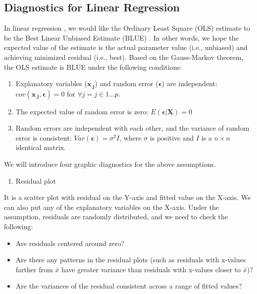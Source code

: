 \documentclass[12pt,]{krantz}
\providecommand{\tightlist}{%
  \setlength{\itemsep}{0pt}\setlength{\parskip}{0pt}}
\begin{document}
\hypertarget{diagnostics-for-linear-regression}{%
\subsection{Diagnostics for Linear Regression}\label{diagnostics-for-linear-regression}}

In linear regression , we would like the Ordinary Least Square (OLS)  estimate to be the Best Linear Unbiased Estimate (BLUE) . In other words, we hope the expected value of the estimate is the actual parameter value (i.e., unbiased) and achieving minimized residual (i.e., best). Based on the Gauss-Markov theorem, the OLS  estimate is BLUE  under the following conditions:

\begin{enumerate}
\def\labelenumi{\arabic{enumi}.}
\item
  Explanatory variables (\(\mathbf{x_{.j}}\)) and random error (\(\mathbf{\epsilon}\)) are independent: \(cov(\mathbf{x_{.j},\epsilon})=0\) for \(\forall j=j\in1...p\).
\item
  The expected value of random error is zero: \(E(\mathbf{\epsilon|X})=0\)
\item
  Random errors are independent with each other, and the variance of random error is consistent: \(Var(\mathbf{\epsilon})=\sigma^{2}I\), where \(\sigma\) is positive and \(I\) is a \(n \times n\) identical matrix.
\end{enumerate}

We will introduce four graphic diagnostics for the above assumptions.

\begin{enumerate}
\def\labelenumi{(\arabic{enumi})}
\tightlist
\item
  Residual plot 
\end{enumerate}

It is a scatter plot with residual on the Y-axis and fitted value on the X-axis. We can also put any of the explanatory variables on the X-axis. Under the assumption, residuals are randomly distributed, and we need to check the following:

\begin{itemize}
\tightlist
\item
  Are residuals centered around zero?
\item
  Are there any patterns in the residual plots (such as residuals with x-values farther from \(\bar{x}\) have greater variance than residuals with x-values closer to \(\bar{x}\))?
\item
  Are the variances of the residual consistent across a range of fitted values?
\end{itemize}
\end{document}
